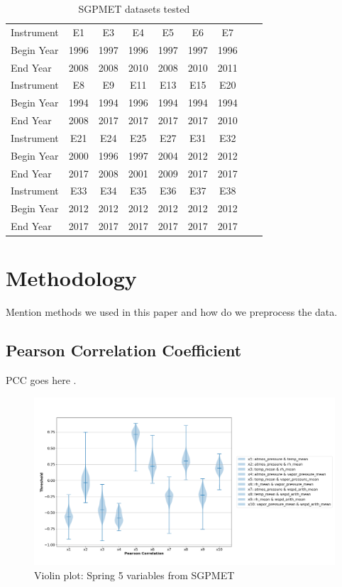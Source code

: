 \documentclass[letterpaper, 10 pt, conference]{ieeeconf}  %
\begin{document}
\begin{table}[ht]
\caption{SGPMET datasets tested}
\label{tab:template}
\centering
\begin{tabular}{|l|c|c|c|c|c|c|c|c|}
\hline
Instrument & E1 & E3 & E4 & E5 & E6 & E7\\
Begin Year & 1996 & 1997 & 1996 & 1997 & 1997 & 1996\\
End Year & 2008 & 2008 & 2010 & 2008 & 2010 & 2011\\
\hline
Instrument & E8 & E9 & E11 & E13 & E15 & E20\\
Begin Year & 1994 & 1994 & 1996 & 1994 & 1994 & 1994\\
End Year & 2008 & 2017 & 2017 & 2017 & 2017 & 2010\\
\hline
Instrument & E21 & E24 & E25 & E27 & E31 & E32\\
Begin Year & 2000 & 1996 & 1997 & 2004 & 2012 & 2012\\
End Year & 2017 & 2008 & 2001 & 2009 & 2017 & 2017\\
\hline
Instrument & E33 & E34 & E35 & E36 & E37 & E38\\
Begin Year & 2012 & 2012 & 2012 & 2012 & 2012 & 2012\\
End Year & 2017 & 2017 & 2017 & 2017 & 2017 & 2017\\
\hline
\end{tabular}
\end{table}

\section{Methodology}
Mention methods we used in this paper and how do we preprocess the data.

\subsection{Pearson Correlation Coefficient} 
PCC goes here \cite{pearson1895note}.
\begin{figure}[ht]
    \centering
    \includegraphics[width=\textwidth]{Spring.png}
    \caption{Violin plot: Spring 5 variables from SGPMET}
    \label{fig:pc}
\end{figure}
\end{document}
